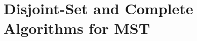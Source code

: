 \setcounter{definition}{0} \setcounter{property}{0} \setcounter{claim}{0} \setcounter{fact}{0} \setcounter{corollary}{0} \setcounter{figure}{0}
\section{Disjoint-Set and Complete Algorithms for MST}


